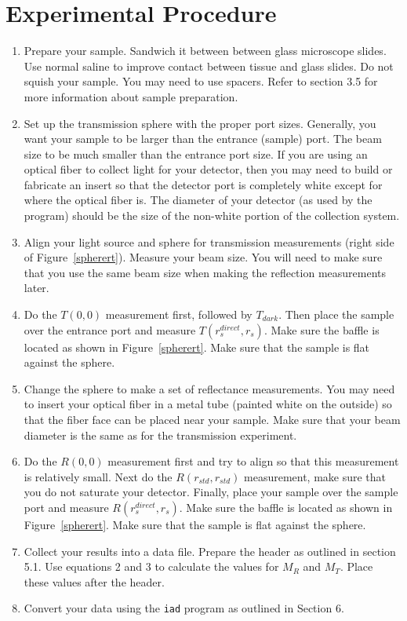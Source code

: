 \documentclass{article}
\newcommand\iadprog{\texttt{iad}}
\begin{document}
\clearpage
\section{Experimental Procedure}

\begin{enumerate}
\item 
Prepare your sample.  Sandwich it between between glass microscope
slides.  Use normal saline to improve contact between tissue and glass slides.
Do not
squish your sample.  You may need to use spacers.
Refer to section 3.5 for more information about sample preparation.  

\item
Set up the transmission sphere with the proper port sizes.  Generally, you want your sample
to be larger than the entrance (sample) port. The beam size to be much smaller 
than the entrance port size.  If you are using an optical fiber to collect light
for your detector, then you may need to build or fabricate an insert so that
the detector port is completely white except for where the optical fiber is.
The diameter of your detector (as used by the program) should be the size of
the non-white portion of the collection system.

\item
Align your light source and sphere for  transmission measurements
(right side of Figure~\ref{spherert}).  Measure your beam size.  You will
need to make sure that you use the same beam size when making the
reflection measurements later.

\item
Do the $T(0,0)$ measurement first, followed by $T_\mathit{dark}$.  Then
place the sample over the entrance port and measure $T(r_s^\mathit{direct},r_s)$.
Make sure the baffle is located as shown in Figure~\ref{spherert}.
Make sure that the sample is flat against the sphere.  

\item
Change the sphere to make a set of reflectance measurements.  You may need
to insert your optical fiber in a metal tube (painted white on the outside)
so that the fiber face can be placed near your sample.  Make sure that your
beam diameter is the same as for the transmission experiment.

\item
Do the $R(0,0)$ measurement first and try to align so that this measurement
is relatively small.  Next do the $R(r_\mathit{std},r_\mathit{std})$ measurement,
make sure that you do not saturate your detector.  Finally, place your
sample over the sample port and measure $R(r_s^\mathit{direct},r_s)$.
Make sure the baffle is located as shown in Figure~\ref{spherert}.
Make sure that the sample is flat against the sphere.  

\item
Collect your results into a data file.  Prepare the header as outlined in
section 5.1.  Use equations 2 and 3 to calculate the values for $M_R$ and
$M_T$.  Place these values after the header.

\item
Convert your data using the \iadprog{} program as outlined in Section 6.


\end{enumerate}
\end{document}
